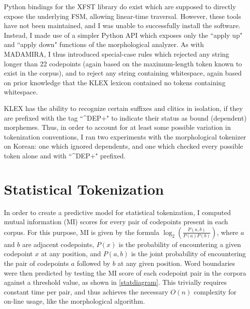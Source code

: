 Python bindings for the XFST library do exist which are supposed to directly expose the underlying FSM, allowing linear-time traversal. However, these tools have not been maintained, and I was unable to successfully install the software. Instead, I made use of a simpler Python API which exposes only the ``apply up" and ``apply down" functions of the morphological analyzer. As with MADAMIRA, I thus introduced special-case rules which rejected any string longer than 22 codepoints (again based on the maximum-length token known to exist in the corpus), and to reject any string containing whitespace, again based on prior knowledge that the KLEX lexicon contained no tokens containing whitespace.

KLEX has the ability to recognize certain suffixes and clitics in isolation, if they are prefixed with the tag ``\^{}DEP+" to indicate their status as bound (dependent) morphemes. Thus, in order to account for at least some possible variation in tokenization conventions, I ran two experiments with the morphological tokenizer on Korean: one which ignored dependents, and one which checked every possible token alone and with ``\^{}DEP+" prefixed.

\section{Statistical Tokenization}
In order to create a predictive model for statistical tokenization, I computed mutual information (MI) scores for every pair of codepoints present in each corpus. For this purpose, MI is given by the formula $\log_2(\frac{P(a,b)}{P(a)P(b)})$, where $a$ and $b$ are adjacent codepoints, $P(x)$ is the probability of encountering a given codepoint $x$ at any position, and $P(a,b)$ is the joint probability of encountering the pair of codepoints $a$ followed by $b$ at any given position. Word boundaries were then predicted by testing the MI score of each codepoint pair in the corpora against a threshold value, as shown in \ref{statdiagram}. This trivially requires constant time per pair, and thus achieves the necessary $O(n)$ complexity for on-line usage, like the morphological algorithm.


